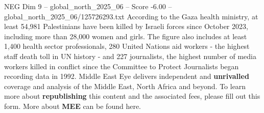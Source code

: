 \begin{textsample}{NEG Dim 9 – global\_north\_2025\_06 – Score -6.00 – global\_north\_2025\_06/125726293.txt}
According to the Gaza health ministry, at least 54,981 Palestinians have been killed by Israeli forces since October 2023, including more than 28,000 women and girls.
The figure also includes at least 1,400 health sector professionals, 280 United Nations aid workers - the highest staff death toll in UN history - and 227 journalists, the highest number of media workers killed in conflict since the Committee to Protect Journalists began recording data in 1992.
Middle East Eye delivers independent and \textbf{unrivalled} coverage and analysis of the Middle East, North Africa and beyond.
To learn more about \textbf{republishing} this content and the associated fees, please fill out this form.
More about \textbf{MEE} can be found here.

\end{textsample}
